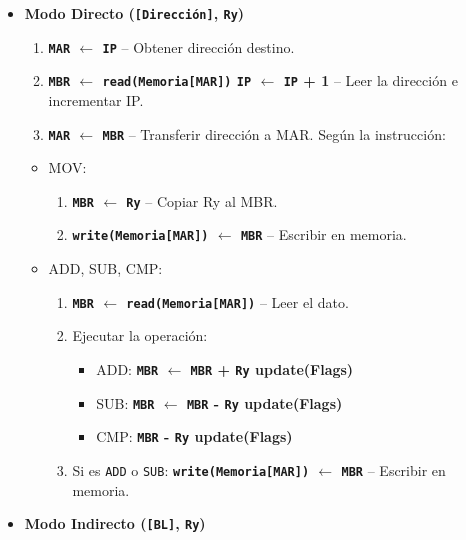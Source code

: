 \documentclass[12pt,oneside]{templates/unerthesis}
\providecommand{\tightlist}{%
  \setlength{\itemsep}{0pt}\setlength{\parskip}{0pt}}
\begin{document}
\begin{itemize}
  \begin{itemize}
  \tightlist
  \item
    \textbf{Modo Directo (\texttt{{[}Dirección{]}}, \texttt{Ry})}

    \begin{enumerate}
    \def\labelenumi{\arabic{enumi}.}
    \setcounter{enumi}{3}
    \tightlist
    \item
      \textbf{\texttt{MAR} \(\leftarrow\) \texttt{IP}} -- Obtener dirección destino.
    \item
      \textbf{\texttt{MBR} \(\leftarrow\) \texttt{read(Memoria{[}MAR{]})} \textbar{} \texttt{IP} \(\leftarrow\) \texttt{IP} + 1} -- Leer la dirección e incrementar IP.
    \item
      \textbf{\texttt{MAR} \(\leftarrow\) \texttt{MBR}} -- Transferir dirección a MAR.
      Según la instrucción:
    \end{enumerate}

    \begin{itemize}
    \tightlist
    \item
      MOV:

      \begin{enumerate}
      \def\labelenumi{\arabic{enumi}.}
      \setcounter{enumi}{6}
      \tightlist
      \item
        \textbf{\texttt{MBR} \(\leftarrow\) \texttt{Ry}} -- Copiar Ry al MBR.
      \item
        \textbf{\texttt{write(Memoria{[}MAR{]})} \(\leftarrow\) \texttt{MBR}} -- Escribir en memoria.
      \end{enumerate}
    \item
      ADD, SUB, CMP:

      \begin{enumerate}
      \def\labelenumi{\arabic{enumi}.}
      \setcounter{enumi}{6}
      \tightlist
      \item
        \textbf{\texttt{MBR} \(\leftarrow\) \texttt{read(Memoria{[}MAR{]})}} -- Leer el dato.
      \item
        Ejecutar la operación:

        \begin{itemize}
        \tightlist
        \item
          ADD: \textbf{\texttt{MBR} \(\leftarrow\) \texttt{MBR} + \texttt{Ry} \textbar{} update(Flags)}
        \item
          SUB: \textbf{\texttt{MBR} \(\leftarrow\) \texttt{MBR} - \texttt{Ry} \textbar{} update(Flags)}
        \item
          CMP: \textbf{\texttt{MBR} - \texttt{Ry} \textbar{} update(Flags)}
        \end{itemize}
      \item
        Si es \texttt{ADD} o \texttt{SUB}: \textbf{\texttt{write(Memoria{[}MAR{]})} \(\leftarrow\) \texttt{MBR}} -- Escribir en memoria.
      \end{enumerate}
    \end{itemize}
  \item
    \textbf{Modo Indirecto (\texttt{{[}BL{]}}, \texttt{Ry})}


\end{itemize}
\end{itemize}
\end{document}
